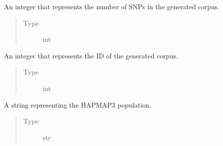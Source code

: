 \documentclass[a4paper,10pt,english]{sphinxhowto}
\begin{document}
\begin{fulllineitems}
\begin{fulllineitems}
\end{fulllineitems}


\begin{fulllineitems}
\label{\detokenize{utils:utils.genotype_corpus_generator.GenotypeCorpusGenerator.num_snps}}
An integer that represents the number of SNPs in the generated corpus.
\begin{quote}\begin{description}
\item[{Type}] \leavevmode
int

\end{description}\end{quote}

\end{fulllineitems}


\begin{fulllineitems}
\label{\detokenize{utils:utils.genotype_corpus_generator.GenotypeCorpusGenerator.corpus_id}}
An integer that represents the ID of the generated corpus.
\begin{quote}\begin{description}
\item[{Type}] \leavevmode
int

\end{description}\end{quote}

\end{fulllineitems}


\begin{fulllineitems}
\label{\detokenize{utils:utils.genotype_corpus_generator.GenotypeCorpusGenerator.pop}}
A string representing the HAPMAP3 population.
\begin{quote}\begin{description}
\item[{Type}] \leavevmode
str


\end{description}
\end{quote}
\end{fulllineitems}
\end{fulllineitems}
\end{document}
